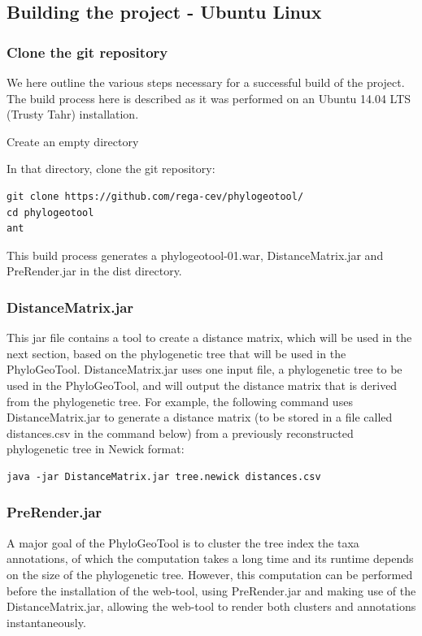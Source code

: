 \documentclass[a4paper, 11pt]{article} %
\begin{document}
\subsection{Building the project - Ubuntu Linux}

\subsubsection{Clone the git repository}
We here outline the various steps necessary for a successful build of the project.
The build process here is described as it was performed on an Ubuntu 14.04 LTS (Trusty Tahr) installation.
\begin{itemize}
\item Create an empty directory
\item {In that directory, clone the git repository: 
\begin{verbatim}
git clone https://github.com/rega-cev/phylogeotool/
cd phylogeotool
ant
\end{verbatim}
\item This build process generates a phylogeotool-01.war, DistanceMatrix.jar and PreRender.jar in the dist directory.
}
\end{itemize}


\subsubsection{DistanceMatrix.jar}
\label{sec:dm}
This jar file contains a tool to create a distance matrix, which will be used in the next section, based on the phylogenetic tree that will be used in the PhyloGeoTool.
DistanceMatrix.jar uses one input file, a phylogenetic tree to be used in the PhyloGeoTool, and will output the distance matrix that is derived from the phylogenetic tree.
For example, the following command uses DistanceMatrix.jar to generate a distance matrix (to be stored in a file called distances.csv in the command below) from a previously reconstructed phylogenetic tree in Newick format: 
\begin{verbatim}
java -jar DistanceMatrix.jar tree.newick distances.csv
\end{verbatim}


\subsubsection{PreRender.jar}
A major goal of the PhyloGeoTool is to cluster the tree index the taxa annotations, of which the computation takes a long time and its runtime depends on the size of the phylogenetic tree. 
However, this computation can be performed before the installation of the web-tool, using PreRender.jar and making use of the DistanceMatrix.jar, allowing the web-tool to render both clusters and annotations instantaneously.
\end{document}
